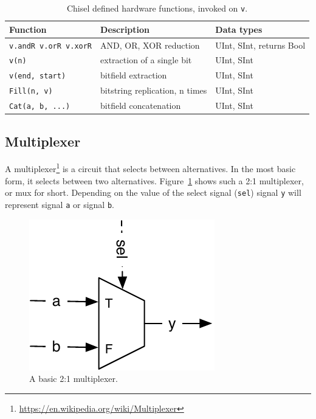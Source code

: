 \documentclass[%
    10pt,
    headinclude, footexclude,
    openright, %
    notitlepage,
    cleardoubleempty,
    headsepline,
    pointlessnumbers,
    bibtotoc, idxtotoc,
    ]{scrbook}
\newcommand{\code}[1]{{\small{\texttt{#1}}}}
\newcommand{\scale}{0.7}
\newcommand{\myref}[2]{\href{#1}{#2}}
\renewcommand{\myref}[2]{{#2}{\footnote{\url{#1}}}}
\begin{document}

\begin{table}
 \centering
 \label{tab:functions}
  \begin{tabular}{lll}
    \toprule
    Function & Description & Data types \\
    \midrule
    \code{v.andR v.orR v.xorR} & AND, OR, XOR reduction & UInt, SInt, returns Bool \\
    \code{v(n)} & extraction of a single bit & UInt, SInt \\
    \code{v(end, start)} & bitfield extraction & UInt, SInt \\
    \code{Fill(n, v)} & bitstring replication, n times & UInt, SInt \\
    \code{Cat(a, b, ...)} & bitfield concatenation & UInt, SInt \\
    \bottomrule 
  \end{tabular} 
  \caption{Chisel defined hardware functions, invoked on \code{v}.}
\end{table}



\subsection{Multiplexer}


A \myref{https://en.wikipedia.org/wiki/Multiplexer}{multiplexer} is a circuit that selects between alternatives.
In the most basic form, it selects between two alternatives. Figure~\ref{fig:mux} shows
such a 2:1 multiplexer, or mux for short. Depending on the value of the
select signal (\code{sel}) signal \code{y} will represent signal \code{a} or
signal \code{b}.

\begin{figure}
  \centering
  \includegraphics[scale=\scale]{figures/mux}
  \caption{A basic 2:1 multiplexer.}
  \label{fig:mux}
\end{figure}
\end{document}
